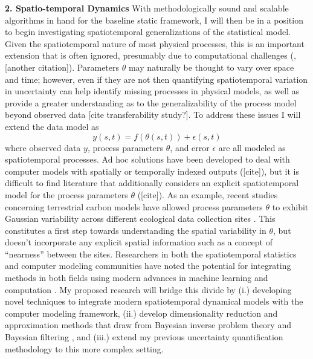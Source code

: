 \documentclass[12pt]{article}
\begin{document}
 \textbf{2. Spatio-temporal Dynamics}
With methodologically sound and scalable algorithms in hand for the baseline static framework, I will then be in a position to begin investigating spatiotemporal generalizations of the statistical model. Given the spatiotemporal nature of most physical processes, this is an important extension that is often ignored, presumably due to computational challenges (\cite{Fer2}, [another citation]). Parameters $\theta$ may naturally be thought to vary over space
and time; however, even if they are not then quantifying spatiotemporal variation in uncertainty can help identify 
missing processes in physical models, as well as provide a greater understanding as to the generalizability of the process model beyond observed data \cite{Fer2, Dietze} [cite transferability study?]. To address these issues I will extend the data model as 
  \[y(s, t) = f(\theta(s, t)) + \epsilon(s, t)\]
 where observed data $y$, process parameters $\theta$, and error $\epsilon$ are all modeled as spatiotemporal processes. Ad hoc solutions have been developed to deal with computer models with spatially or temporally indexed outputs ([cite]), but it is difficult to find literature that additionally considers an 
 explicit spatiotemporal model for the process parameters $\theta$ ([cite]). As an example, recent studies concerning terrestrial carbon models have 
 allowed process parameters $\theta$ to exhibit Gaussian variability across different ecological data collection
sites \cite{Fer2}. This constitutes a first step towards understanding the spatial variability in $\theta$, but doesn't incorporate any explicit spatial information such as a concept of ``nearness'' between the sites. Researchers in both the spatiotemporal statistics and computer modeling communities
have noted the potential for integrating methods in both fields using modern advances in machine learning and computation \cite{Wikle, Baker}. My proposed research will bridge this divide by (i.) developing novel techniques to integrate modern spatiotemporal dynamical models \cite{Wikle, Hefley}
with the computer modeling framework, (ii.) develop dimensionality reduction and approximation methods that draw from Bayesian inverse problem 
theory \cite{Kugler} and Bayesian filtering \cite{Sarkka}, and (iii.) extend my previous uncertainty quantification methodology to this more complex setting. 
 
\end{document}
